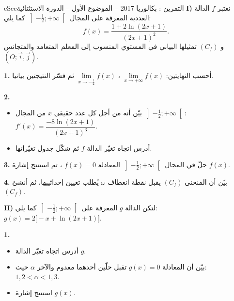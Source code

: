 \documentclass[12pt,a4paper]{article}
\newenvironment{BOX}[2]{\begin{otherlanguage}{english}\begin{arbox}{#1}{#2}}{\end{arbox}\end{otherlanguage}}
\newcounter{exo}
\newenvironment{tamrin}[1]{\stepcounter{exo}\begin{BOX}{cSec}{التمرين \theexo: #1}}{\end{BOX}}
\newenvironment{sq}{\begin{itemize}[leftmargin=2.4em,itemsep=3pt]}{\end{itemize}}
\newcommand{\qa}{\item[(أ)]}\newcommand{\qb}{\item[(ب)]}\newcommand{\qc}{\item[(جـ)]}\newcommand{\qd}{\item[(د)]}\newcommand{\qe}{\item[(هـ)]}
\newcommand{\QQ}[1]{\par\smallskip\textbf{#1.} }
\begin{document}
\begin{tamrin}{بكالوريا 2017 -- الموضوع الأول -- الدورة الاستثنائية}
\textbf{I)} نعتبر $f$ الدالة العددية المعرفة على المجال $\left]-\frac12;+\infty\right[$ كما يلي:
\[f(x)=\frac{1+2\ln(2x+1)}{(2x+1)^2}.\]
و $(C_f)$ تمثيلها البياني في المستوي المنسوب إلى المعلم المتعامد والمتجانس $(O;\vec i,\vec j)$.
\QQ{1} أحسب النهايتين: $\lim\limits_{x\to+\infty}f(x)$ ، $\lim\limits_{x\to-\frac12}f(x)$ ثم فسّر النتيجتين بيانيا.
\QQ{2}
\begin{sq}
\qa بيّن أنه من أجل كل عدد حقيقي $x$ من المجال $\left]-\frac12;+\infty\right[$: \ $f'(x)=\dfrac{-8\ln(2x+1)}{(2x+1)^3}$.
\qb أدرس اتجاه تغيّر الدالة $f$ ثم شكّل جدول تغيّراتها.
\end{sq}
\QQ{3} حلّ في المجال $\left]-\frac12;+\infty\right[$ المعادلة $f(x)=0$ ، ثم استنتج إشارة $f(x)$.
\QQ{4} بيّن أن المنحنى $(C_f)$ يقبل نقطة انعطاف $\omega$ يُطلب تعيين إحداثييها، ثم أنشئ $(C_f)$.

\textbf{II)} لتكن الدالة $g$ المعرفة على $\left]-\frac12;+\infty\right[$ كما يلي: \ $g(x)=2\big[-x+\ln(2x+1)\big]$.
\QQ{1}
\begin{sq}
\qa أدرس اتجاه تغيّر الدالة $g$.
\qb بيّن أن المعادلة $g(x)=0$ تقبل حلّين أحدهما معدوم والآخر $\alpha$ حيث: $1{,}2<\alpha<1{,}3$.
\qc استنتج إشارة $g(x)$.
\end{sq}
\end{tamrin}
\end{document}
